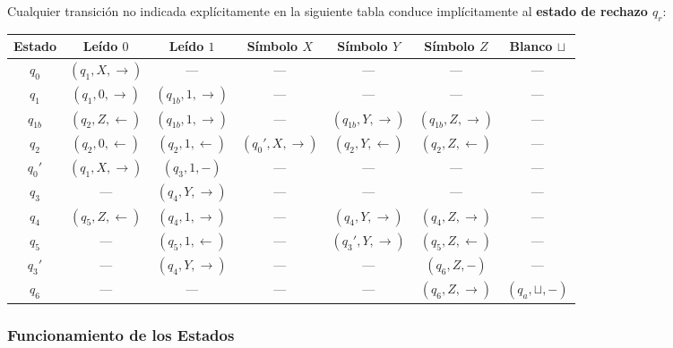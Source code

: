 Cualquier transición no indicada explícitamente en la siguiente tabla conduce implícitamente al \textbf{estado de rechazo $q_r$}:

\vspace{0.3cm}
\begin{center}
\renewcommand{\arraystretch}{1.3}
\begin{tabular}{|c|c|c|c|c|c|c|}
\hline
\textbf{Estado} & \textbf{Leído $0$} & \textbf{Leído $1$} & \textbf{Símbolo $X$} & \textbf{Símbolo $Y$} & \textbf{Símbolo $Z$} & \textbf{Blanco $\sqcup$} \\ \hline
$q_0$    & $(q_1, X, \to)$        & ---                 & ---              & ---                 & ---                 & --- \\ \hline
$q_1$    & $(q_1, 0, \to)$        & $(q_{1b}, 1, \to)$  & ---              & ---                 & ---                 & --- \\ \hline
$q_{1b}$ & $(q_2, Z, \leftarrow)$ & $(q_{1b}, 1, \to)$  & ---              & $(q_{1b}, Y, \to)$  & $(q_{1b}, Z, \to)$  & --- \\ \hline
$q_2$    & $(q_2, 0, \leftarrow)$ & $(q_2, 1, \leftarrow)$ & $(q_0', X, \to)$ & $(q_2, Y, \leftarrow)$ & $(q_2, Z, \leftarrow)$ & --- \\ \hline
$q_0'$   & $(q_1, X, \to)$        & $(q_3, 1, -)$       & ---              & ---                 & ---                 & --- \\ \hline
$q_3$    & ---                    & $(q_4, Y, \to)$     & ---              & ---                 & ---                 & --- \\ \hline
$q_4$    & $(q_5, Z, \leftarrow)$ & $(q_4, 1, \to)$     & ---              & $(q_4, Y, \to)$     & $(q_4, Z, \to)$     & --- \\ \hline
$q_5$    & ---                    & $(q_5, 1, \leftarrow)$ & ---           & $(q_3', Y, \to)$    & $(q_5, Z, \leftarrow)$ & --- \\ \hline
$q_3'$   & ---                    & $(q_4, Y, \to)$     & ---              & ---                 & $(q_6, Z, -)$       & --- \\ \hline
$q_6$    & ---                    & ---                 & ---              & ---                 & $(q_6, Z, \to)$     & $(q_a, \sqcup, -)$ \\ \hline
\end{tabular}
\end{center}

\subsubsection*{Funcionamiento de los Estados}

